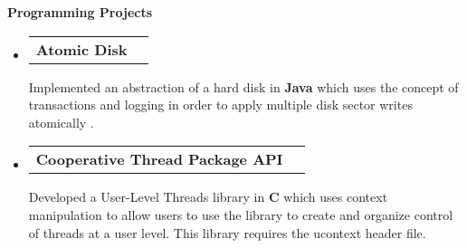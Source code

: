 \documentclass[letterpaper,10pt]{article}
\makeatletter
\newcommand{\resheading}[1]{{\Large \colorbox{mygrey}{\begin{minipage}{\textwidth}{\textbf{#1 \vphantom{p\^{E}}}}\end{minipage}}}}
\newcommand{\projectheading}[1]{
\begin{tabular*}{6.5in}{l@{\extracolsep{\fill}}r}
		\textbf{#1}
\end{tabular*}\vspace{6pt}}
\makeatother
\begin{document}
\resheading{Programming Projects}
	\begin{itemize}
		\item 
			\projectheading{Atomic Disk}
				{
				\begin{itemize}\vspace{-6pt}
					{Implemented an abstraction of a hard disk in \textbf{Java} which}
					{uses the concept of transactions and logging in order to apply multiple}
					{disk sector writes atomically .}
				\end{itemize}
				}
		\item
			\projectheading{Cooperative Thread Package API}
				{
				\begin{itemize}\vspace{-6pt}
					{Developed a User-Level Threads library in \textbf{C} which uses context manipulation}
					{to allow users to use the library to create and organize control of threads at a user level.}
					{This library requires the ucontext header file.}
				\end{itemize}
        			}


\end{itemize}
\end{document}
